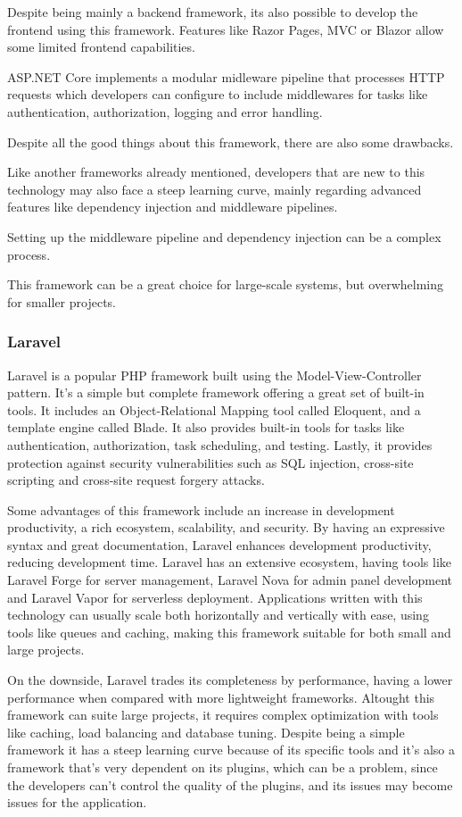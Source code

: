 Despite being mainly a backend framework, its also possible to develop the
frontend using this framework. Features like Razor Pages, MVC or Blazor allow
some limited frontend capabilities.

ASP.NET Core implements a modular midleware pipeline that processes HTTP
requests which developers can configure to include middlewares for tasks like
authentication, authorization, logging and error handling.

Despite all the good things about this framework, there are also some drawbacks.

Like another frameworks already mentioned, developers that are new to this
technology may also face a steep learning curve, mainly regarding advanced
features like dependency injection and middleware pipelines.

Setting up the middleware pipeline and dependency injection can be a complex
process.

This framework can be a great choice for large-scale systems, but overwhelming
for smaller projects.
\subsubsection{Laravel}
Laravel is a popular PHP framework built using the Model-View-Controller
pattern. It's a simple but complete framework offering a great set of built-in
tools. It includes an Object-Relational Mapping tool called Eloquent, and a
template engine called Blade. It also provides built-in tools for tasks like
authentication, authorization, task scheduling, and testing. Lastly, it
provides protection against security vulnerabilities such as SQL injection,
cross-site scripting and cross-site request forgery attacks.

Some advantages of this framework include an increase in development
productivity, a rich ecosystem, scalability, and security.
By having an expressive syntax and great documentation, Laravel enhances
development productivity, reducing development time.
Laravel has an extensive ecosystem, having tools like Laravel Forge for server
management, Laravel Nova for admin panel development and Laravel Vapor for
serverless deployment.
Applications written with this technology can usually scale both horizontally
and vertically with ease, using tools like queues and caching, making this
framework suitable for both small and large projects.

On the downside, Laravel trades its completeness by performance, having a
lower performance when compared with more lightweight frameworks.
Altought this framework can suite large projects, it requires complex
optimization with tools like caching, load balancing and database tuning.
Despite being a simple framework it has a steep learning curve because of its
specific tools and it's also a framework that's very dependent on its plugins,
which can be a problem, since the developers can't control the quality of the
plugins, and its issues may become issues for the application.

